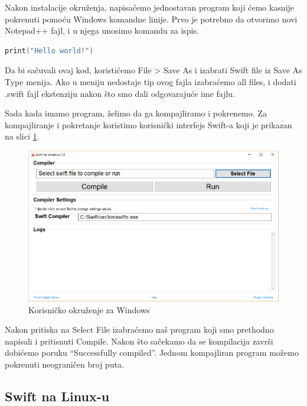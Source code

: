 \documentclass[a4paper]{article}
\begin{document}
Nakon instalacije okruženja, napisaćemo jednostavan program koji ćemo kasnije pokrenuti pomoću Windows komandne linije. Prvo je potrebno da otvorimo novi Notepad++ fajl, i u njega unosimo komandu za ispis.

\begin{lstlisting}[language=Swift]
print("Hello world!")
\end{lstlisting}

Da bi sačuvali ovaj kod, koristićemo File > Save As i izabrati Swift file iz Save As Type menija. Ako u meniju nedostaje tip ovog fajla izabraćemo all files, i dodati .swift fajl ekstenziju nakon što smo dali odgovarajuće ime fajlu.

Sada kada imamo program, želimo da ga kompajliramo i pokrenemo. Za kompajliranje i pokretanje koristimo korisnički interfejs Swift-a koji je prikazan na slici \ref{fig:windows}.

\begin{figure}[h!]
\begin{center}
\includegraphics[scale=0.35]{swift-win.png}
\end{center}
\caption{Korisničko okruženje za Windows}
\label{fig:windows}
\end{figure}


Nakon pritiska na Select File izabraćemo naš program koji smo prethodno napisali i pritisnuti Compile. Nakon što sačekamo da se kompilacija završi dobićemo poruku “Successfully compiled”.
Jednom kompajliran program možemo pokrenuti neograničen broj puta.

\subsection{Swift na Linux-u}
\label{subsec:podnaslovLinux}
\end{document}
